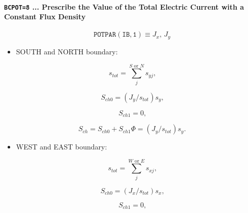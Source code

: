 \documentclass[11pt]{article}
\begin{document}
\bigskip

\bigskip

\paragraph{\texttt{BCPOT=8} ... Prescribe the Value of the Total Electric
Current with a Constant Flux Density}

\bigskip

\begin{equation*}
\mathtt{POTPAR(IB,1)}\equiv J_{x}\text{, }J_{y}
\end{equation*}

\bigskip

\begin{itemize}
\item  SOUTH and NORTH boundary:
\end{itemize}

\begin{equation}
s_{tot}=\sum_{j}^{S\text{ or }N}s_{yj}\text{,}   \label{c337}
\end{equation}

\begin{equation}
S_{ch0}=\left( J_{y}/s_{tot}\right) s_{y}\text{,}   \label{c338}
\end{equation}

\begin{equation}
S_{ch1}=0\text{,}   \label{c339}
\end{equation}

\begin{equation}
S_{ch}=S_{ch0}+S_{ch1}\Phi=\left( J_{y}/s_{tot}\right) s_{y}\text{.} 
\label{c340}
\end{equation}

\bigskip

\begin{itemize}
\item  WEST and EAST boundary:
\end{itemize}

\begin{equation}
s_{tot}=\sum_{j}^{W\text{ or }E}s_{xj}\text{,}   \label{c341}
\end{equation}

\begin{equation}
S_{ch0}=\left( J_{x}/s_{tot}\right) s_{x}\text{,}   \label{c342}
\end{equation}

\begin{equation}
S_{ch1}=0\text{,}   \label{c343}
\end{equation}
\end{document}
